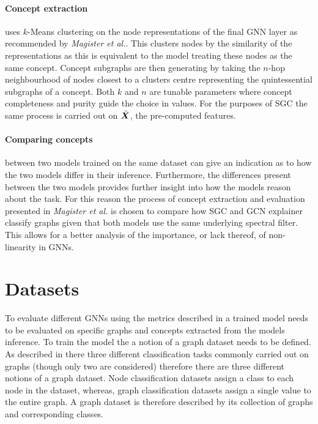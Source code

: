 
\paragraph{Concept extraction}
uses $k$-Means clustering on the node representations of the final GNN layer as recommended by \textit{Magister et al.}\cite{magister2021gcexplainer}.
This clusters nodes by the similarity of the representations as this is equivalent to the model treating these nodes as the same concept.
Concept subgraphs are then generating by taking the $n$-hop neighbourhood of nodes closest to a clusters centre representing the quintessential subgraphs of a concept.
Both $k$ and $n$ are tunable parameters where concept completeness and purity guide the choice in values.
For the purposes of SGC the same process is carried out on $\bar{{\bm{X}}}$, the pre-computed features.

\paragraph{Comparing concepts} between two models trained on the same dataset can give an indication as to how the two models differ in their inference.
Furthermore, the differences present between the two models provides further insight into how the models reason about the task.
For this reason the process of concept extraction and evaluation presented in \textit{Magister et al.}\cite{magister2021gcexplainer} is chosen to compare how SGC and GCN explainer classify graphs given that both models use the same underlying spectral filter.
This allows for a better analysis of the importance, or lack thereof, of non-linearity in GNNs.  

\section{Datasets}
\label{sec:datasets-theory}


To evaluate different GNNs using the metrics described in  a trained model needs to be evaluated on specific graphs and concepts extracted from the models inference.
To train the model the a notion of a graph dataset needs to be defined.
As described in  there three different classification tasks commonly carried out on graphs (though only two are considered) therefore there are three different notions of a graph dataset.
Node classification datasets assign a class to each node in the dataset, whereas, graph classification datasets assign a single value to the entire graph.
A graph dataset is therefore described by its collection of graphs and corresponding classes.

